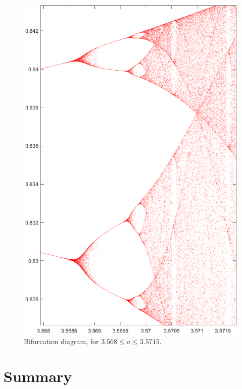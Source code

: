 \documentclass[twocolumn,amsmath,amssymb,aps]{revtex4}
\begin{document}
\begin{figure}[!htb]
	\centering
	\includegraphics[scale=0.35]{logistic_5_more_branches}
	\caption{Bifurcation diagram, for $3.568 \leq a \leq 3.5715$.}
	\label{fig:logistic_5}
\end{figure}







\section{Summary}
\end{document}
